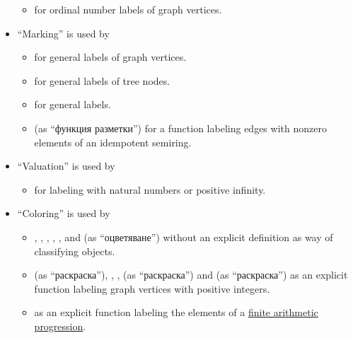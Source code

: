 \begin{remark}
\begin{itemize}
\begin{itemize}
      \item {} for ordinal number labels of graph vertices.
    \end{itemize}

    \item \enquote{Marking} is used by
    \begin{itemize}
      \item {} for general labels of graph vertices.

      \item {} for general labels of tree nodes.

      \item {} for general labels.

      \item {} (as \enquote{функция разметки}) for a function labeling edges with nonzero elements of an idempotent semiring.
    \end{itemize}

    \item \enquote{Valuation} is used by
    \begin{itemize}
      \item {} for labeling with natural numbers or positive infinity.
    \end{itemize}

    \item \enquote{Coloring} is used by
    \begin{itemize}
      \item {}, , , , ,  and  (as \enquote{оцветяване}) without an explicit definition as way of classifying objects.

      \item {} (as \enquote{раскраска}), , ,  (as \enquote{раскраска}) and  (as \enquote{раскраска}) as an explicit function labeling graph vertices with positive integers.

      \item {} as an explicit function labeling the elements of a \hyperref[def:arithmetic_progression]{finite arithmetic progression}.


\end{itemize}
\end{itemize}
\end{remark}
